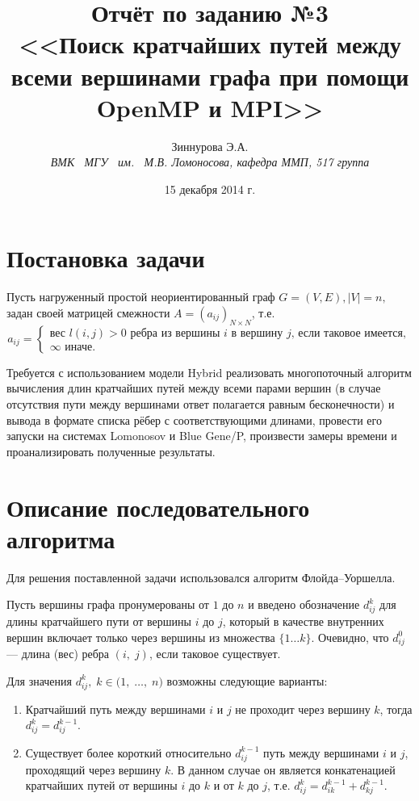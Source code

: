\documentclass[a4paper,12pt]{report}
\begin{document}
\title{Отчёт по заданию №3 \\ <<Поиск кратчайших путей между всеми вершинами графа при помощи OpenMP и MPI>>}
\author{Зиннурова Э.А. \\ \textit{ВМК \, МГУ \, им. \, М.В. Ломоносова, кафедра ММП, 517 группа}}
\date{15 декабря 2014 г.}

\maketitle

\section*{Постановка задачи}
	\par Пусть нагруженный простой неориентированный граф $G=(V, E), |V| = n,$ задан своей матрицей смежности $A = (a_{ij})_{N \times N}$, т.е. 
	$$a_{ij} = \begin{cases}
		\text{вес $l(i,j) > 0$ ребра из вершины $i$ в вершину $j$, если таковое имеется},\\
		\infty \text{ иначе}.
		\end{cases}
$$
	\par Требуется с использованием модели Hybrid реализовать многопоточный алгоритм вычисления длин кратчайших путей между всеми парами вершин (в случае отсутствия пути между вершинами ответ полагается равным бесконечности) и вывода в формате списка рёбер с соответствующими длинами, провести его запуски на системах Lomonosov и Blue Gene/P, произвести замеры времени и проанализировать полученные результаты.
	
\section*{Описание последовательного алгоритма}
	\par Для решения поставленной задачи использовался алгоритм Флойда--Уоршелла.
	\par Пусть вершины графа пронумерованы от $1$ до $n$ и введено обозначение $d_{i j}^{k}$ для длины кратчайшего пути от вершины $i$ до $j$, который в качестве внутренних вершин включает только через вершины из множества $\{1 \ldots k\}$. Очевидно, что $d_{i j}^{0}$ — длина (вес) ребра $(i,\;j)$, если таковое существует.
	\par Для значения $d_{i j}^{k},\;k \in \mathbb (1,\;\ldots,\;n)$ возможны следующие варианты:
	\begin{enumerate}
	\item
	Кратчайший путь между вершинами $i$ и $j$ не проходит через вершину $k$, тогда $d_{i j}^{k}=d_{i j}^{k-1}$.
	\item
	Существует более короткий относительно $d_{ij}^{k-1}$ путь между вершинами $i$ и $j$, проходящий через вершину $k$. В данном случае он является конкатенацией кратчайших путей от вершины $i$ до $k$ и от $k$ до $j$, т.е. $d_{i j}^{k}=d_{i k}^{k-1} + d_{k j}^{k-1}.$
	\end{enumerate}
\end{document}
